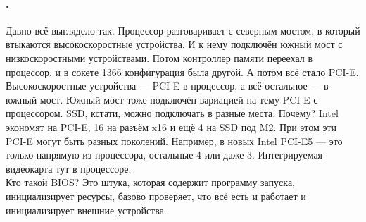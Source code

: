 \documentclass{article}
\begin{document}
    \paragraph{.}
    Давно всё выглядело так. Процессор разговаривает с северным мостом, в который втыкаются высокоскоростные устройства. И к нему подключён южный мост с низкоскоростными устройствами. Потом контроллер памяти переехал в процессор, и в сокете 1366 конфигурация была другой.
    А потом всё стало PCI-E. Высокоскоростные устройства --- PCI-E в процессор, а всё остальное --- в южный мост. Южный мост тоже подключён вариацией на тему PCI-E с процессором. SSD, кстати, можно подключать в разные места. Почему? Intel экономят на PCI-E, 16 на разъём x16 и ещё 4 на SSD под M2. При этом эти PCI-E могут быть разных поколений. Например, в новых Intel PCI-E5 --- это только напрямую из процессора, остальные 4 или даже 3. Интегрируемая видеокарта тут в процессоре.\\
    Кто такой BIOS? Это штука, которая содержит программу запуска, инициализирует ресурсы, базово проверяет, что всё есть и работает и инициализирует внешние устройства.
\end{document}
